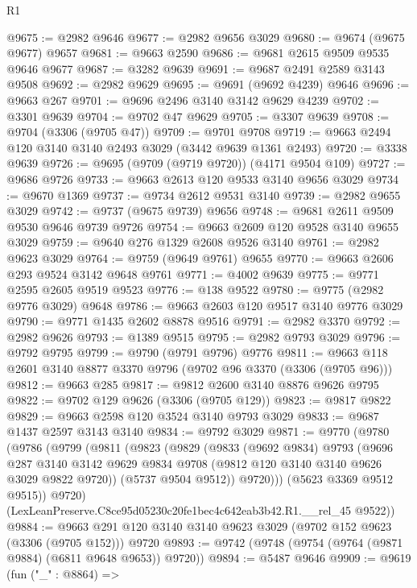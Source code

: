 \begin{lexlean}{R1}
\begin{coremodule}
@9675 := @2982 @9646
@9677 := @2982 @9656 @3029
@9680 := @9674 (@9675 @9677) @9657
@9681 := @9663 @2590
@9686 := @9681 @2615 @9509 @9535 @9646 @9677
@9687 := @3282 @9639
@9691 := @9687 @2491 @2589 @3143 @9508
@9692 := @2982 @9629
@9695 := @9691 (@9692 @4239) @9646
@9696 := @9663 @267
@9701 := @9696 @2496 @3140 @3142 @9629 @4239
@9702 := @3301 @9639
@9704 := @9702 @47 @9629
@9705 := @3307 @9639
@9708 := @9704 (@3306 (@9705 @47))
@9709 := @9701 @9708
@9719 := @9663 @2494 @120 @3140 @3140 @2493 @3029 (@3442 @9639 @1361 @2493)
@9720 := @3338 @9639
@9726 := @9695 (@9709 (@9719 @9720)) (@4171 @9504 @109)
@9727 := @9686 @9726
@9733 := @9663 @2613 @120 @9533 @3140 @9656 @3029
@9734 := @9670 @1369
@9737 := @9734 @2612 @9531 @3140
@9739 := @2982 @9655 @3029
@9742 := @9737 (@9675 @9739) @9656
@9748 := @9681 @2611 @9509 @9530 @9646 @9739 @9726
@9754 := @9663 @2609 @120 @9528 @3140 @9655 @3029
@9759 := @9640 @276 @1329 @2608 @9526 @3140
@9761 := @2982 @9623 @3029
@9764 := @9759 (@9649 @9761) @9655
@9770 := @9663 @2606 @293 @9524 @3142 @9648 @9761
@9771 := @4002 @9639
@9775 := @9771 @2595 @2605 @9519 @9523
@9776 := @138 @9522
@9780 := @9775 (@2982 @9776 @3029) @9648
@9786 := @9663 @2603 @120 @9517 @3140 @9776 @3029
@9790 := @9771 @1435 @2602 @8878 @9516
@9791 := @2982 @3370
@9792 := @2982 @9626
@9793 := @1389 @9515
@9795 := @2982 @9793 @3029
@9796 := @9792 @9795
@9799 := @9790 (@9791 @9796) @9776
@9811 := @9663 @118 @2601 @3140 @8877 @3370 @9796 (@9702 @96 @3370 (@3306 (@9705 @96)))
@9812 := @9663 @285
@9817 := @9812 @2600 @3140 @8876 @9626 @9795
@9822 := @9702 @129 @9626 (@3306 (@9705 @129))
@9823 := @9817 @9822
@9829 := @9663 @2598 @120 @3524 @3140 @9793 @3029
@9833 := @9687 @1437 @2597 @3143 @3140
@9834 := @9792 @3029
@9871 := @9770
    (@9780
      (@9786
        (@9799
          (@9811
            (@9823
              (@9829
                (@9833
                  (@9692 @9834)
                  @9793
                  (@9696
                    @287
                    @3140
                    @3142
                    @9629
                    @9834
                    @9708
                    (@9812 @120 @3140 @3140 @9626 @3029 @9822 @9720))
                  (@5737 @9504 @9512))
                @9720)))
          (@5623 @3369 @9512 @9515))
        @9720)
      (LexLeanPreserve.C8ce95d05230c20fe1bec4c642eab3b42.R1.__rel_45 @9522))
@9884 := @9663 @291 @120 @3140 @3140 @9623 @3029 (@9702 @152 @9623 (@3306 (@9705 @152))) @9720
@9893 := @9742 (@9748 (@9754 (@9764 (@9871 @9884) (@6811 @9648 @9653)) @9720))
@9894 := @5487 @9646
@9909 := @9619
    (fun ("_" : @8864) =>

\end{coremodule}
\end{lexlean}
